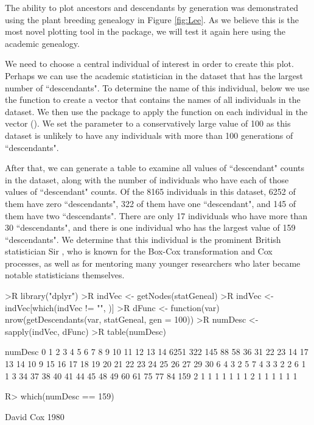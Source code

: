 \documentclass[article,shortnames]{jss}
\begin{document}
The ability to plot ancestors and descendants by generation was demonstrated using the plant breeding genealogy in Figure \ref{fig:Lee}. As we believe this is the most novel plotting tool in the  package, we will test it again here using the academic genealogy.

We need to choose a central individual of interest in order to create this plot. Perhaps we can use the academic statistician in the dataset that has the largest number of ``descendants". To determine the name of this individual, below we use the  function  to create a vector  that contains the names of all individuals in the dataset. We then use the  package to apply the  function  on each individual in the  vector (\citealt{dplyr}). We set the parameter  to a conservatively large value of 100 as this dataset is unlikely to have any individuals with more than 100 generations of ``descendants".

After that, we can generate a table to examine all values of ``descendant" counts in the dataset, along with the number of individuals who have each of those values of ``descendant" counts. Of the 8165 individuals in this dataset, 6252 of them have zero ``descendants", 322 of them have one ``descendant", and 145 of them have two ``descendants". There are only 17 individuals who have more than 30 ``descendants", and there is one individual who has the largest value of 159 ``descendants". We determine that this individual is the prominent British statistician Sir , who is known for the Box-Cox transformation and Cox processes, as well as for mentoring many younger researchers who later became notable statisticians themselves.

\begin{CodeChunk}
\begin{CodeInput}
>R library("dplyr")
>R indVec <- getNodes(statGeneal)
>R indVec <- indVec[which(indVec != "", )]
>R dFunc <- function(var) nrow(getDescendants(var, statGeneal, gen = 100))
>R numDesc <- sapply(indVec, dFunc)
>R table(numDesc)
\end{CodeInput}
\begin{CodeOutput}
numDesc
   0    1    2    3    4    5    6    7    8    9   10   11   12   13   14
6251  322  145   88   58   36   31   22   23   14   17   13   14   10    9
  15   16   17   18   19   20   21   22   23   24   25   26   27   29   30
   6    4    3    2    5    7    4    3    3    2    2    6    1    1    3
  34   37   38   40   41   44   45   48   49   60   61   75   77   84  159
   2    1    1    1    1    1    1    1    2    1    1    1    1    1    1
\end{CodeOutput}
\begin{CodeInput}
R> which(numDesc == 159)
\end{CodeInput}
\begin{CodeOutput}
David Cox
     1980
\end{CodeOutput}
\end{CodeChunk}
\end{document}
